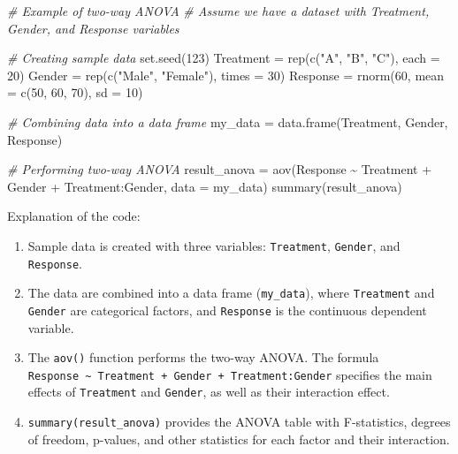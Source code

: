 \documentclass[
]{article}
\newenvironment{Shaded}{}{}
\newcommand{\AttributeTok}[1]{\textcolor[rgb]{0.49,0.56,0.16}{#1}}
\newcommand{\CommentTok}[1]{\textcolor[rgb]{0.38,0.63,0.69}{\textit{#1}}}
\newcommand{\DecValTok}[1]{\textcolor[rgb]{0.25,0.63,0.44}{#1}}
\newcommand{\FunctionTok}[1]{\textcolor[rgb]{0.02,0.16,0.49}{#1}}
\newcommand{\NormalTok}[1]{#1}
\newcommand{\OtherTok}[1]{\textcolor[rgb]{0.00,0.44,0.13}{#1}}
\newcommand{\SpecialCharTok}[1]{\textcolor[rgb]{0.25,0.44,0.63}{#1}}
\newcommand{\StringTok}[1]{\textcolor[rgb]{0.25,0.44,0.63}{#1}}
\begin{document}
\begin{Shaded}
\begin{Highlighting}[]
\CommentTok{\# Example of two{-}way ANOVA}
\CommentTok{\# Assume we have a dataset with \textquotesingle{}Treatment\textquotesingle{}, \textquotesingle{}Gender\textquotesingle{}, and \textquotesingle{}Response\textquotesingle{} variables}

\CommentTok{\# Creating sample data}
\FunctionTok{set.seed}\NormalTok{(}\DecValTok{123}\NormalTok{)}
\NormalTok{Treatment }\OtherTok{=} \FunctionTok{rep}\NormalTok{(}\FunctionTok{c}\NormalTok{(}\StringTok{"A"}\NormalTok{, }\StringTok{"B"}\NormalTok{, }\StringTok{"C"}\NormalTok{), }\AttributeTok{each =} \DecValTok{20}\NormalTok{)}
\NormalTok{Gender }\OtherTok{=} \FunctionTok{rep}\NormalTok{(}\FunctionTok{c}\NormalTok{(}\StringTok{"Male"}\NormalTok{, }\StringTok{"Female"}\NormalTok{), }\AttributeTok{times =} \DecValTok{30}\NormalTok{)}
\NormalTok{Response }\OtherTok{=} \FunctionTok{rnorm}\NormalTok{(}\DecValTok{60}\NormalTok{, }\AttributeTok{mean =} \FunctionTok{c}\NormalTok{(}\DecValTok{50}\NormalTok{, }\DecValTok{60}\NormalTok{, }\DecValTok{70}\NormalTok{), }\AttributeTok{sd =} \DecValTok{10}\NormalTok{)}

\CommentTok{\# Combining data into a data frame}
\NormalTok{my\_data }\OtherTok{=} \FunctionTok{data.frame}\NormalTok{(Treatment, Gender, Response)}

\CommentTok{\# Performing two{-}way ANOVA}
\NormalTok{result\_anova }\OtherTok{=} \FunctionTok{aov}\NormalTok{(Response }\SpecialCharTok{\textasciitilde{}}\NormalTok{ Treatment }\SpecialCharTok{+}\NormalTok{ Gender }\SpecialCharTok{+}\NormalTok{ Treatment}\SpecialCharTok{:}\NormalTok{Gender, }\AttributeTok{data =}\NormalTok{ my\_data)}
\FunctionTok{summary}\NormalTok{(result\_anova)}
\end{Highlighting}
\end{Shaded}

Explanation of the code:

\begin{enumerate}
\def\labelenumi{\arabic{enumi}.}
\item
  Sample data is created with three variables: \texttt{Treatment},
  \texttt{Gender}, and \texttt{Response}.
\item
  The data are combined into a data frame (\texttt{my\_data}), where
  \texttt{Treatment} and \texttt{Gender} are categorical factors, and
  \texttt{Response} is the continuous dependent variable.
\item
  The \texttt{aov()} function performs the two-way ANOVA. The formula
  \texttt{Response\ \textasciitilde{}\ Treatment\ +\ Gender\ +\ Treatment:Gender}
  specifies the main effects of \texttt{Treatment} and \texttt{Gender},
  as well as their interaction effect.
\item
  \texttt{summary(result\_anova)} provides the ANOVA table with
  F-statistics, degrees of freedom, p-values, and other statistics for
  each factor and their interaction.
\end{enumerate}
\end{document}
